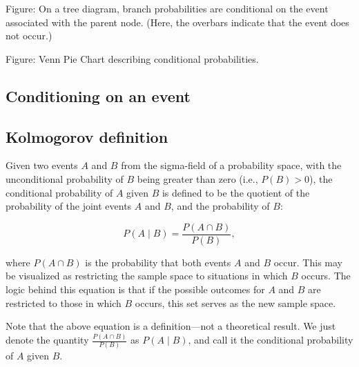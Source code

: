 Figure: On a tree diagram, branch probabilities are conditional on the event associated
with the parent node. (Here, the overbars indicate that the event does not occur.)






Figure: Venn Pie Chart describing conditional probabilities.




\subsection{Conditioning on an event}
\label{sss:cond-b2d2}





\subsection{Kolmogorov definition}
\label{sss:kolm-1516}




Given two events $A$ and $B$ from the sigma-field of a probability space, with the
unconditional probability of $B$ being greater than zero (i.e., $P(B) > 0$), the
conditional probability of $A$ given $B$ is defined to be the quotient of the probability
of the joint events $A$ and $B$, and the probability of $B$:



$$P(A \mid B) = \frac{P(A \cap B)}{P(B)},$$



where $P(A \cap B)$ is the probability that both events $A$ and $B$ occur. This may be
visualized as restricting the sample space to situations in which $B$ occurs. The logic
behind this equation is that if the possible outcomes for $A$ and $B$ are restricted to
those in which $B$ occurs, this set serves as the new sample space.



Note that the above equation is a definition—not a theoretical result. We just denote the
quantity $\frac{P(A \cap B)}{P(B)}$ as $P(A \mid B)$, and call it the conditional
probability of $A$ given $B$.




